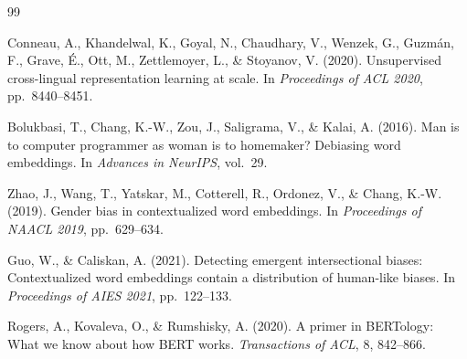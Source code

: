 \documentclass[11pt,a4paper]{article}
\begin{document}
\begin{thebibliography}{99}

Conneau, A., Khandelwal, K., Goyal, N., Chaudhary, V., Wenzek, G.,
Guzm\'{a}n, F., Grave, \'{E}., Ott, M., Zettlemoyer, L., \& Stoyanov, V.
(2020).
Unsupervised cross-lingual representation learning at scale.
In \textit{Proceedings of ACL 2020}, pp.\ 8440--8451.

Bolukbasi, T., Chang, K.-W., Zou, J., Saligrama, V., \& Kalai, A. (2016).
Man is to computer programmer as woman is to homemaker?
Debiasing word embeddings.
In \textit{Advances in NeurIPS}, vol.\ 29.

Zhao, J., Wang, T., Yatskar, M., Cotterell, R., Ordonez, V., \& Chang, K.-W.
(2019).
Gender bias in contextualized word embeddings.
In \textit{Proceedings of NAACL 2019}, pp.\ 629--634.

Guo, W., \& Caliskan, A. (2021).
Detecting emergent intersectional biases: Contextualized word embeddings
contain a distribution of human-like biases.
In \textit{Proceedings of AIES 2021}, pp.\ 122--133.

Rogers, A., Kovaleva, O., \& Rumshisky, A. (2020).
A primer in BERTology: What we know about how BERT works.
\textit{Transactions of ACL}, 8, 842--866.

\end{thebibliography}
\end{document}
